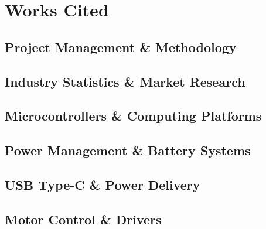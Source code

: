 
\section{Works Cited}
\label{sec:works-cited}

\nocite{*}


\subsection{Project Management \& Methodology}
\printbibliography[heading=none, keyword=management]

\subsection{Industry Statistics \& Market Research}
\printbibliography[heading=none, keyword=market]

\subsection{Microcontrollers \& Computing Platforms}
\printbibliography[heading=none, keyword=computing]

\subsection{Power Management \& Battery Systems}
\printbibliography[heading=none, keyword=power]

\subsection{USB Type-C \& Power Delivery}
\printbibliography[heading=none, keyword=usbc]

\subsection{Motor Control \& Drivers}
\printbibliography[heading=none, keyword=motors]

